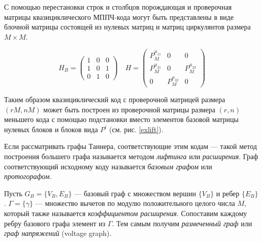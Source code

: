 
С помощью перестановки строк и столбцов порождающая и проверочная матрицы квазициклического МППЧ-кода
могут быть представлены в виде блочной матрицы состоящей из нулевых матриц и матриц циркулянтов размера
$M \times M$.

\begin{equation} \label{exlift}
	H_B=\begin{pmatrix}
		1 & 0 & 0 \\
		1 & 0 & 1 \\
		0 & 1 & 0
	\end{pmatrix}
	\quad
	H=\begin{pmatrix}
		P^{\mu_{11}}_M & 0 & 0 \\
		P^{\mu_{21}}_M & 0 & P^{\mu_{23}}_M \\
		0 & P^{\mu_{32}}_M & 0
	\end{pmatrix}
\end{equation}

Таким образом квазициклический код с проверочной матрицей размера $(rM,nM)$ может быть построен из проверочной
матрицы размера $(r,n)$ меньшего кода с помощью подстановки вместо элементов базовой матрицы нулевых блоков
 и блоков вида $P^i$ (см. рис. \ref{exlift}). 
 
  Если рассматривать графы Таннера, соответствующие этим кодам --- такой метод построения
 большего графа называется методом \textit{лифтинга} или \textit{расширения}. Граф соответствующий 
 исходному коду называется \textit{базовым графом} или \textit{протогорафом}.

Пусть $G_B=\{V_B, E_B\}$ --- базовый граф с множеством вершин $\{V_B\}$ и ребер $\{E_B\}$.
$\Gamma=\{\gamma\}$ --- множество вычетов по модулю положительного целого числа $M$, который также 
называется \textit{коэффициентом расширения}. Сопоставим каждому ребру базового графа элемент из $\Gamma$.
Тем самым получим \textit{размеченный граф} или \textit{граф напряжений} (voltage graph).


